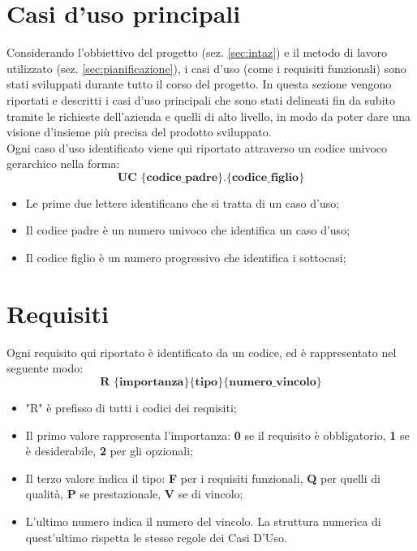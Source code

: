 \section{Casi d'uso principali}
Considerando l'obbiettivo del progetto (sez. \ref{sec:intaz}) e il metodo di 
lavoro utilizzato (sez. \ref{sec:pianificazione}), i casi d'uso (come i requisiti 
funzionali) sono stati sviluppati durante tutto il corso del progetto. 
In questa sezione vengono riportati e descritti i casi d'uso principali che 
sono stati delineati fin da subito tramite le richieste dell'azienda e quelli 
di alto livello, in modo da poter dare una visione d’insieme più precisa del 
prodotto sviluppato. \\

Ogni caso d'uso identificato viene qui riportato attraverso un codice univoco 
gerarchico nella forma:
$$ \textbf{UC \{codice\_padre\}.\{codice\_figlio\}  } $$
\begin{itemize}
	\item Le prime due lettere identificano che si tratta di un caso d'uso;
	\item Il codice padre è un numero univoco che identifica un caso d'uso;
	\item Il codice figlio è un numero progressivo che identifica i sottocasi;\\
\end{itemize}



\section{Requisiti}
Ogni requisito qui riportato è identificato da un codice, ed è rappresentato nel seguente modo:
$$ \textbf{R \{importanza\}\{tipo\}\{numero\_vincolo\} } $$

\begin{itemize}
	\item "R" è prefisso di tutti i codici dei requisiti;
	\item Il primo valore rappresenta l'importanza: \textbf{0} se il requisito è obbligatorio, \textbf{1} se è desiderabile, \textbf{2} per gli opzionali;
	\item Il terzo valore indica il tipo: \textbf{F} per i requisiti funzionali, \textbf{Q} per quelli di qualità, \textbf{P} se prestazionale, \textbf{V} se di vincolo;
	\item L'ultimo numero indica il numero del vincolo. La struttura numerica di quest'ultimo rispetta le stesse regole dei Casi D'Uso.
\end{itemize}

